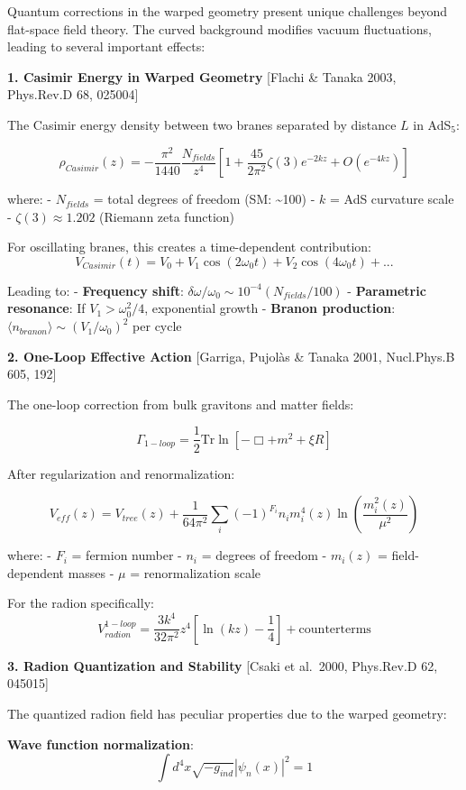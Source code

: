 \documentclass[
  11pt,
]{report}
\begin{document}
Quantum corrections in the warped geometry present unique challenges
beyond flat-space field theory. The curved background modifies vacuum
fluctuations, leading to several important effects:

\textbf{1. Casimir Energy in Warped Geometry} {[}Flachi \& Tanaka 2003,
Phys.Rev.D 68, 025004{]}

The Casimir energy density between two branes separated by distance
\(L\) in AdS\(_5\):

\[\rho_{Casimir}(z) = -\frac{\pi^2}{1440} \frac{N_{fields}}{z^4} \left[1 + \frac{45}{2\pi^2}\zeta(3)e^{-2kz} + O(e^{-4kz})\right]\]

where: - \(N_{fields}\) = total degrees of freedom (SM:
\textasciitilde100) - \(k\) = AdS curvature scale -
\(\zeta(3) \approx 1.202\) (Riemann zeta function)

For oscillating branes, this creates a time-dependent contribution:
\[V_{Casimir}(t) = V_0 + V_1 \cos(2\omega_0 t) + V_2 \cos(4\omega_0 t) + ...\]

Leading to: - \textbf{Frequency shift}:
\(\delta\omega/\omega_0 \sim 10^{-4} (N_{fields}/100)\) -
\textbf{Parametric resonance}: If \(V_1 > \omega_0^2/4\), exponential
growth - \textbf{Branon production}:
\(\langle n_{branon} \rangle \sim (V_1/\omega_0)^2\) per cycle

\textbf{2. One-Loop Effective Action} {[}Garriga, Pujolàs \& Tanaka
2001, Nucl.Phys.B 605, 192{]}

The one-loop correction from bulk gravitons and matter fields:

\[\Gamma_{1-loop} = \frac{1}{2}\text{Tr}\ln\left[-\Box + m^2 + \xi R\right]\]

After regularization and renormalization:

\[V_{eff}(z) = V_{tree}(z) + \frac{1}{64\pi^2}\sum_i (-1)^{F_i} n_i m_i^4(z) \ln\left(\frac{m_i^2(z)}{\mu^2}\right)\]

where: - \(F_i\) = fermion number - \(n_i\) = degrees of freedom -
\(m_i(z)\) = field-dependent masses - \(\mu\) = renormalization scale

For the radion specifically:
\[V_{radion}^{1-loop} = \frac{3k^4}{32\pi^2} z^4 \left[\ln(kz) - \frac{1}{4}\right] + \text{counterterms}\]

\textbf{3. Radion Quantization and Stability} {[}Csaki et al.~2000,
Phys.Rev.D 62, 045015{]}

The quantized radion field has peculiar properties due to the warped
geometry:

\textbf{Wave function normalization}:
\[\int d^4x \sqrt{-g_{ind}} |ψ_n(x)|^2 = 1\]
\end{document}
